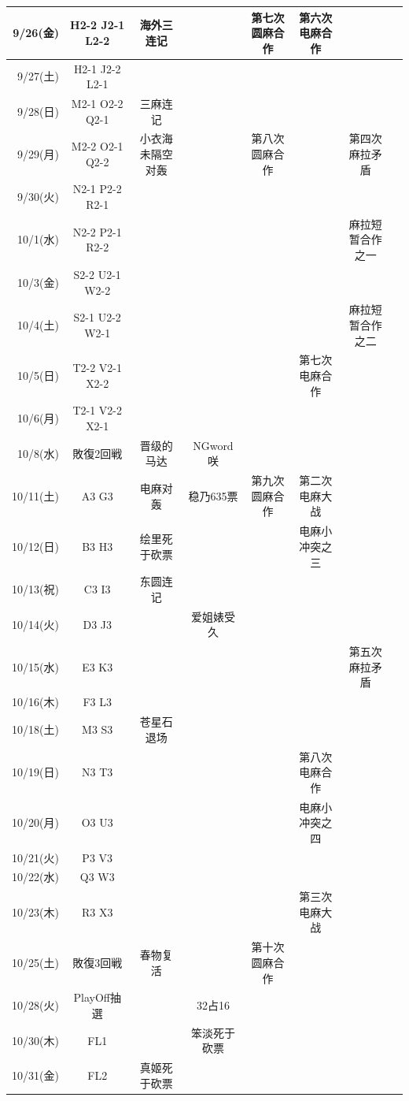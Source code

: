 {\begin{longtable}{rccccccc}
	9/26(金) & H2-2 J2-1 L2-2 & 海外三连记 &  & 第七次圆麻合作 & 第六次电麻合作 &\\ \hline
	9/27(土) & H2-1 J2-2 L2-1 &  &  &  &  &\\ \hline
	9/28(日) & M2-1 O2-2 Q2-1 & 三麻连记 &  &  &  &\\ \hline
	9/29(月) & M2-2 O2-1 Q2-2 & 小衣海未隔空对轰 &  & 第八次圆麻合作 &  & 第四次麻拉矛盾\\ \hline
	9/30(火) & N2-1 P2-2 R2-1 &  &  &  &  &\\ \hline
	10/1(水) & N2-2 P2-1 R2-2 &  &  &  &  & 麻拉短暂合作之一\\ \hline
	10/3(金) & S2-2 U2-1 W2-2 &  &  &  &  &\\ \hline
	10/4(土) & S2-1 U2-2 W2-1 &  &  &  &  & 麻拉短暂合作之二\\ \hline
	10/5(日) & T2-2 V2-1 X2-2 &  &  &  & 第七次电麻合作 &\\ \hline
	10/6(月) & T2-1 V2-2 X2-1 &  &  &  &  &\\ \hline
	10/8(水) & 敗復2回戦 & 晋级的马达 & NGword 咲 &  &  &\\ \hline
	10/11(土) & A3 G3 & 电麻对轰 & 稳乃635票 & 第九次圆麻合作 & 第二次电麻大战 &\\ \hline
	10/12(日) & B3 H3 & 绘里死于砍票 &  &  & 电麻小冲突之三 &\\ \hline
	10/13(祝) & C3 I3 & 东圆连记 &  &  &  &\\ \hline
	10/14(火) & D3 J3 &  & 爱姐婊受久 &  &  &\\ \hline
	10/15(水) & E3 K3 &  &  &  &  & 第五次麻拉矛盾\\ \hline
	10/16(木) & F3 L3 &  &  &  &  &\\ \hline
	10/18(土) & M3 S3 & 苍星石退场 &  &  &  &\\ \hline
	10/19(日) & N3 T3 &  &  &  & 第八次电麻合作 &\\ \hline
	10/20(月) & O3 U3 &  &  &  & 电麻小冲突之四 &\\ \hline
	10/21(火) & P3 V3 &  &  &  &  &\\ \hline
	10/22(水) & Q3 W3 &  &  &  &  &\\ \hline
	10/23(木) & R3 X3 &  &  &  & 第三次电麻大战 &\\ \hline
	10/25(土) & 敗復3回戦 & 春物复活 &  & 第十次圆麻合作 &  &\\ \hline
	10/28(火) & PlayOff抽選 &  & 32占16 &  &  &\\ \hline
	10/30(木) & FL1 &  & 笨淡死于砍票 &  &  &\\ \hline
	10/31(金) & FL2 & 真姬死于砍票 &  &  &  &\\ \hline

\end{longtable}}
